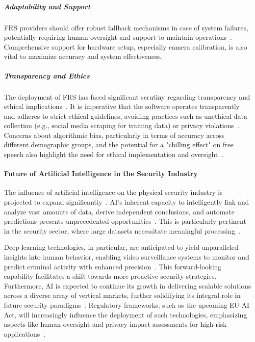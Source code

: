 \subparagraph{Adaptability and Support}
FRS providers should offer robust fallback mechanisms in case of system failures, potentially requiring human oversight and support to maintain operations~\cite{securityindustry_2025_transforming}. Comprehensive support for hardware setup, especially camera calibration, is also vital to maximize accuracy and system effectiveness.

\subparagraph{Transparency and Ethics}
The deployment of FRS has faced significant scrutiny regarding transparency and ethical implications~\cite{ergun_2025_ethical, sustainability_2025_ethical}. It is imperative that the software operates transparently and adheres to strict ethical guidelines, avoiding practices such as unethical data collection (e.g., social media scraping for training data) or privacy violations~\cite{ergun_2025_ethical, sustainability_2025_ethical}. Concerns about algorithmic bias, particularly in terms of accuracy across different demographic groups, and the potential for a "chilling effect" on free speech also highlight the need for ethical implementation and oversight~\cite{sustainability_2025_ethical}.

\paragraph{Future of Artificial Intelligence in the Security Industry}
The influence of artificial intelligence on the physical security industry is projected to expand significantly~\cite{securityindustry_2025_transforming}. AI's inherent capacity to intelligently link and analyze vast amounts of data, derive independent conclusions, and automate predictions presents unprecedented opportunities~\cite{securityindustry_2025_transforming}. This is particularly pertinent in the security sector, where large datasets necessitate meaningful processing~\cite{securityindustry_2025_transforming}.

Deep-learning technologies, in particular, are anticipated to yield unparalleled insights into human behavior, enabling video surveillance systems to monitor and predict criminal activity with enhanced precision~\cite{securityindustry_2025_transforming}. This forward-looking capability facilitates a shift towards more proactive security strategies. Furthermore, AI is expected to continue its growth in delivering scalable solutions across a diverse array of vertical markets, further solidifying its integral role in future security paradigms~\cite{securityindustry_2025_transforming}. Regulatory frameworks, such as the upcoming EU AI Act, will increasingly influence the deployment of such technologies, emphasizing aspects like human oversight and privacy impact assessments for high-risk applications~\cite{getfocal_biometric_2025}.

